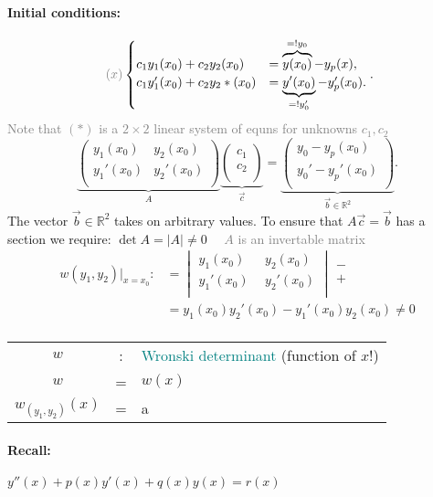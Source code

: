 \documentclass[]{article}
\begin{document}
\paragraph{Initial conditions:} \[
\text{ \textcolor{gray}{$(x)$}} 
\begin{cases} 
	c_1y_1(x_0)+c_2y_2(x_0) &= \overbrace{y(x_0)}^{=!y_0}-y_p(x), \\
	c_1y_1'(x_0)+c_2y_2*(x_0) &= \underbrace{y'(x_0)}_{=!y_0'}-y_p'(x_0) .
\end{cases}
.\]
\textcolor{gray}{Note that $(*)$ is a $2\times 2$ linear system of equns for unknowns $c_1,c_2$}
\[
\underbrace{\begin{pmatrix}
	y_1(x_0) & y_2(x_0) \\
	y_1'(x_0) & y_2'(x_0) \\
\end{pmatrix}}_A 
\underbrace{ \begin{pmatrix}
c_1 \\ c_2 \\
\end{pmatrix}}_{\vec c}
=
\underbrace{ \begin{pmatrix}
y_0 -y_p(x_0) \\ 
y_0' -y_p'(x_0) \\ 
\end{pmatrix}}_{\vec b\in \mathbb R ^{2}}
.\]
The vector $\vec b\in \mathbb R ^{2}$ takes on arbitrary values. To ensure that $A\vec c = \vec b$ has a section we require: $\det A =|A|\not=0\quad$ \textcolor{gray}{$A$ is an invertable matrix}
\[
	\begin{split}
		w(y_1,y_2)\Big|_{x=x_0} : &=
	\begin{vmatrix}
	y_1(x_0)~ & ~y_2(x_0) \\
	y_1'(x_0)~ & ~y_2'(x_0) \\
	\end{vmatrix} \begin{matrix}
	- \\ + 
	\end{matrix}\\
					  &=y_1(x_0)y_2'(x_0)-y_1'(x_0)y_2(x_0)\not=0\\
	\end{split}
\]
\begin{tabular}{c c l}
	$w$ & : & \textcolor{teal}{Wronski determinant} (function of $x$!)\\
	$w$ & = & $w(x)$ \\
	$w_{(y_1,y_2)}(x)$& = & a
\end{tabular}
\paragraph{Recall:} $y''(x)+p(x)y'(x)+q(x)y(x)=r(x)$
\end{document}
